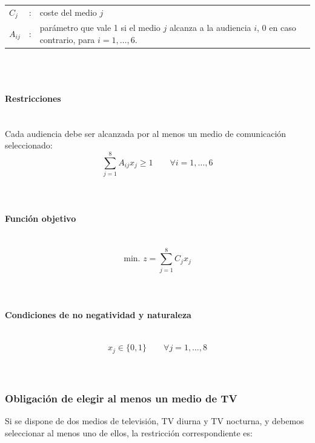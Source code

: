 \begin{tabular}{l c l}
$C_j$ & : & coste del medio $j$ \\
$A_{ij}$ & : & parámetro que vale 1 si el medio $j$ alcanza a la audiencia $i$, 0 en caso contrario, para $i = 1, \dots, 6$.\\
\end{tabular}
\\
\\

\paragraph{Restricciones}\mbox{}\\

Cada audiencia debe ser alcanzada por al menos un medio de comunicación seleccionado:
\begin{equation}
\sum_{j=1}^{8} A_{ij}x_j \geq 1 \qquad \forall i = 1,\dots,6
\end{equation}
\\
\\

\paragraph{Función objetivo}\mbox{}\\

\begin{equation}
\mbox{min. } z = \sum_{j=1}^{8} C_j x_j
\end{equation}
\\
\\

\paragraph{Condiciones de no negatividad y naturaleza}\mbox{}\\
\begin{equation}
x_j \in \{0,1\} \qquad \forall j = 1,\dots,8
\end{equation}
\\
\\

\subsubsection{Obligación de elegir al menos un medio de TV}

Si se dispone de dos medios de televisión, TV diurna y TV nocturna, y debemos seleccionar al menos uno de ellos, la restricción correspondiente es:

